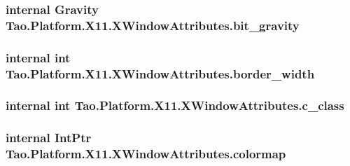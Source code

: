 \label{struct_tao_1_1_platform_1_1_x11_1_1_x_window_attributes_a019fe3b537ac92d3fd3b9d8fa1008d6a}
\hypertarget{struct_tao_1_1_platform_1_1_x11_1_1_x_window_attributes_a12efdaab4afffb89295cae13da1a4fa3}{
\subsubsection[{bit\_\-gravity}]{\setlength{\rightskip}{0pt plus 5cm}internal {\bf Gravity} {\bf Tao.Platform.X11.XWindowAttributes.bit\_\-gravity}}}
\label{struct_tao_1_1_platform_1_1_x11_1_1_x_window_attributes_a12efdaab4afffb89295cae13da1a4fa3}
\hypertarget{struct_tao_1_1_platform_1_1_x11_1_1_x_window_attributes_aba96b32537815461a7bf427dad1a84b5}{
\subsubsection[{border\_\-width}]{\setlength{\rightskip}{0pt plus 5cm}internal int {\bf Tao.Platform.X11.XWindowAttributes.border\_\-width}}}
\label{struct_tao_1_1_platform_1_1_x11_1_1_x_window_attributes_aba96b32537815461a7bf427dad1a84b5}
\hypertarget{struct_tao_1_1_platform_1_1_x11_1_1_x_window_attributes_a9e7a2b99428a7dfd07276ad26d6b8468}{
\subsubsection[{c\_\-class}]{\setlength{\rightskip}{0pt plus 5cm}internal int {\bf Tao.Platform.X11.XWindowAttributes.c\_\-class}}}
\label{struct_tao_1_1_platform_1_1_x11_1_1_x_window_attributes_a9e7a2b99428a7dfd07276ad26d6b8468}
\hypertarget{struct_tao_1_1_platform_1_1_x11_1_1_x_window_attributes_a5636bba1d646bf1fdacba573b65174b9}{
\subsubsection[{colormap}]{\setlength{\rightskip}{0pt plus 5cm}internal IntPtr {\bf Tao.Platform.X11.XWindowAttributes.colormap}}}
